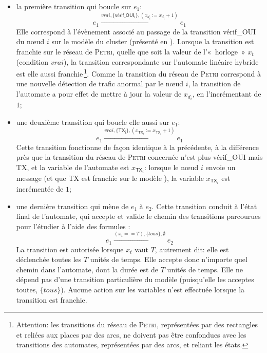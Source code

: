 \begin{itemize}
    \item la première transition qui boucle sur $e_1$:
        \[e_1\xrightarrow{\mathit{vrai},\{\mathsf{vérif\_OUI_i}\},(x_{d_i}:=x_{d_i}+1)}{e_1}\]
        Elle correspond à l'évènement associé au passage de la transition \textsf{vérif\_OUI} du nœud $i$ sur le modèle \rpsge du cluster (présenté en ).
        Lorsque la transition est franchie sur le réseau de \textsc{Petri}, quelle que soit la valeur de l'«~horloge~» $x_t$ (condition $\mathit{vrai}$), la transition correspondante sur l'automate linéaire hybride est elle aussi franchie\,\footnote{Attention: les transitions du réseau de \textsc{Petri}, représentées par des rectangles et reliées aux places par des arcs, ne doivent pas être confondues avec les transitions des automates, représentées par des arcs, et reliant les états.}.
        Comme la transition du réseau de \textsc{Petri} correspond à une nouvelle détection de trafic anormal par le nœud $i$, la transition de l'automate a pour effet de mettre à jour la valeur de $x_{d_i}$, en l'incrémentant de $1$;
    \item une deuxième transition qui boucle elle aussi sur $e_1$:
        \[e_1\xrightarrow{\mathit{vrai},\{\mathsf{TX_i}\},(x_{\mathsf{TX}_i}:=x_{\mathsf{TX}_i}+1)}{e_1}\]
        Cette transition fonctionne de façon identique à la précédente, à la différence près que la transition du réseau de \textsc{Petri} concernée n'est plus \textsf{vérif\_OUI} mais \textsf{TX}, et la variable de l'automate est $x_{\mathsf{TX}_i}$: lorsque le nœud $i$ envoie un message (et que \textsf{TX} est franchie sur le modèle \rpsge), la variable $x_{\mathsf{TX}_i}$ est incrémentée de $1$;
    \item une dernière transition qui mène de $e_1$ à $e_2$.
        Cette transition conduit à l'état final de l'automate, qui accepte et valide le chemin des transitions parcourues pour l'étudier à l'aide des formules \lsah:
        \[e_1\xrightarrow{(x_t==T),\{\mathit{tous}\},\emptyset}{e_2}\]
        La transition est autorisée lorsque $x_t$ vaut $T$, autrement dit: elle est déclenchée toutes les $T$ unités de temps.
        Elle accepte donc n'importe quel chemin dans l'automate, dont la durée est de $T$ unités de temps.
        Elle ne dépend pas d'une transition particulière du modèle \rpsge (puisqu'elle les acceptes toutes, $\{\mathit{tous}\}$).
        Aucune action sur les variables n'est effectuée lorsque la transition est franchie.
\end{itemize}

